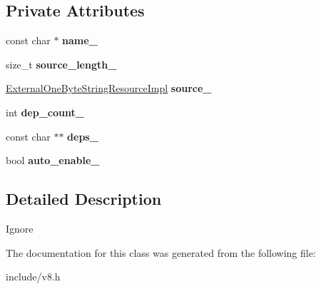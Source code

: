 \subsection*{Private Attributes}
\begin{DoxyCompactItemize}
\item 
const char $\ast$ {\bfseries name\+\_\+}\hypertarget{classv8_1_1_extension_adcdd12a726668185217ad5623e6c5a43}{}\label{classv8_1_1_extension_adcdd12a726668185217ad5623e6c5a43}

\item 
size\+\_\+t {\bfseries source\+\_\+length\+\_\+}\hypertarget{classv8_1_1_extension_a7912969d063d4efe694e0450f6ecd8bc}{}\label{classv8_1_1_extension_a7912969d063d4efe694e0450f6ecd8bc}

\item 
\hyperlink{classv8_1_1_external_one_byte_string_resource_impl}{External\+One\+Byte\+String\+Resource\+Impl} {\bfseries source\+\_\+}\hypertarget{classv8_1_1_extension_ac9242897191bf63ad580715c8469d59b}{}\label{classv8_1_1_extension_ac9242897191bf63ad580715c8469d59b}

\item 
int {\bfseries dep\+\_\+count\+\_\+}\hypertarget{classv8_1_1_extension_ac892d429dd433624cfa4c865613465f5}{}\label{classv8_1_1_extension_ac892d429dd433624cfa4c865613465f5}

\item 
const char $\ast$$\ast$ {\bfseries deps\+\_\+}\hypertarget{classv8_1_1_extension_ae8198584f50edab2521b9344fa3d443f}{}\label{classv8_1_1_extension_ae8198584f50edab2521b9344fa3d443f}

\item 
bool {\bfseries auto\+\_\+enable\+\_\+}\hypertarget{classv8_1_1_extension_a4c7d7140358ffe5c661581af0238ea62}{}\label{classv8_1_1_extension_a4c7d7140358ffe5c661581af0238ea62}

\end{DoxyCompactItemize}


\subsection{Detailed Description}
Ignore 

The documentation for this class was generated from the following file\+:\begin{DoxyCompactItemize}
\item 
include/v8.\+h\end{DoxyCompactItemize}
